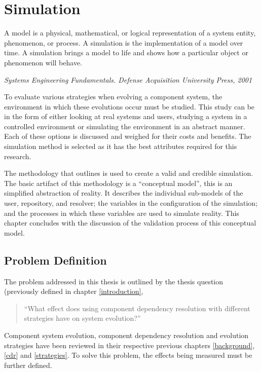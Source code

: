 \chapter{Simulation}
\label{simulation}
\epigraph{A model is a physical, mathematical, or logical representation of a system entity, phenomenon, or process. A simulation is the implementation of a model over time. A simulation brings a model to life and shows how a particular object or phenomenon will behave.}{\textit{Systems Engineering Fundamentals. Defense Acquisition University Press, 2001}}

{}To evaluate various strategies when evolving a component system, the environment in which these evolutions occur must be studied.
{}This study can be in the form of either looking at real systems and users, studying a system in a controlled environment or simulating the environment in an abstract manner.
{}Each of these options is discussed and weighed for their costs and benefits.
{}The simulation method is selected as it has the best attributes required for this research.

{}The methodology that \cite{Law2005} outlines is used to create a valid and credible simulation.
{}The basic artifact of this methodology is a ``conceptual model'', this is an simplified abstraction of reality.
{}It describes the individual sub-models of the user, repository, and resolver; the variables in the configuration of the simulation;
{}and the processes in which these variables are used to simulate reality.
{}This chapter concludes with the discussion of the validation process of this conceptual model.

\section{Problem Definition}
The problem addressed in this thesis is outlined by the thesis question (previously defined in chapter \ref{introduction},

\begin{quotation}
``What effect does using component dependency resolution with different strategies have on system evolution?''
\end{quotation}

Component system evolution, component dependency resolution and evolution strategies have been reviewed in their respective previous chapters \ref{background}, \ref{cdr} and \ref{strategies}.
To solve this problem, the effects being measured must be further defined.

